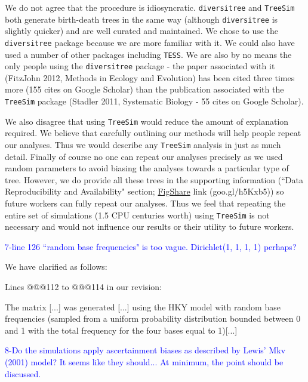 \documentclass[11pt]{letter}
\begin{document}
\begin{letter}{}
We do not agree that the procedure is idiosyncratic. \texttt{diversitree} and \texttt{TreeSim} both generate birth-death trees in the same way (although \texttt{diversitree} is slightly quicker) and are well curated and maintained. We chose to use the \texttt{diversitree} package because we are more familiar with it. We could also have used a number of other packages including \texttt{TESS}. We are also by no means the only people using the \texttt{diversitree} package - the paper associated with it (FitzJohn 2012, Methods in Ecology and Evolution) has been cited three times more (155 cites on Google Scholar) than the publication associated with the \texttt{TreeSim} package (Stadler 2011, Systematic Biology - 55 cites on Google Scholar).

We also disagree that using \texttt{TreeSim} would reduce the amount of explanation required. We believe that carefully outlining our methods will help people repeat our analyses. Thus we would describe any \texttt{TreeSim} analysis in just as much detail.
Finally of course no one can repeat our analyses precisely as we used random parameters to avoid biasing the analyses towards a particular type of tree. However, we do provide all these trees in the supporting information (``Data Reproducibility and Availability" section; \href{http://figshare.com/articles/Effect_of_missing_data_on_topological_inference_using_a_total_evidence_approach/1306861}{FigShare} link (goo.gl/h5Kxb5)) so future workers can fully repeat our analyses. Thus we feel that repeating the entire set of simulations (1.5 CPU centuries worth) using \texttt{TreeSim} is not necessary and would not influence our results or their utility to future workers.


\textcolor{blue}{7-line 126 ``random base frequencies" is too vague. Dirichlet(1, 1, 1, 1) perhaps?}

We have clarified as follows:

Lines @@@112 to @@@114 in our revision:

\hfill\begin{minipage}{\dimexpr\textwidth-1cm}
The matrix [...] was generated [...] using the HKY model with random base frequencies (sampled from a uniform probability distribution bounded between 0 and 1 with the total frequency for the four bases equal to 1)[...]
\end{minipage}


\textcolor{blue}{8-Do the simulations apply ascertainment biases as described by Lewis' Mkv (2001) model? It seems like they should... At minimum, the point should be discussed.}


\end{letter}
\end{document}
